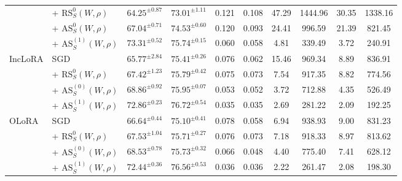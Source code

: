 \documentclass[10pt]{article} %
\begin{document}
{\begin{table}[ht]
{\begin{tabular}{@{}p{1.15cm} p{1.8cm} c c c c c c c c@{}}
& + $\mathrm{RS}^{0}_S(W,\rho)$  &$64.25^{\pm 0.87}$ & $73.01^{\pm 1.11}$ &0.121 &0.108 &47.29 &1444.96 &30.35 &1338.16\\
& + $\mathrm{AS}^{0}_S(W,\rho)$    &$67.04^{\pm 0.71}$ & $74.53^{\pm 0.60}$ & 0.120  & 0.093 & 24.41   & 996.59   & 21.39  & 821.45   \\
 & + $\mathrm{AS}^{(1)}_S(W,\rho)$   &$73.31^{\pm 0.52}$ & $75.74^{\pm 0.15}$  & 0.060  &0.058  & 4.81    & 339.49   & 3.72   & 240.91   \\
\midrule
\multirow{4}{*}{{IncLoRA}}
& SGD    &$65.77^{\pm 2.84}$  &$75.41^{\pm 0.26}$ & 0.076    & 0.062 & 15.46 & 969.34  & 8.89  & 836.91 \\
& + $\mathrm{RS}^{0}_S(W,\rho)$ & $67.42^{\pm 1.23}$ & $75.79^{\pm 0.42}$  &0.075 &0.073 &7.54 &917.35 &8.82 &774.56\\
& + $\mathrm{AS}^{(0)}_S(W,\rho)$    &$68.86^{\pm 0.92}$ & $75.95^{\pm 0.07}$  & 0.053   & 0.052 & 3.72    & 712.88   & 4.35   & 526.49   \\
 &+ $\mathrm{AS}^{(1)}_S(W,\rho)$  &$72.86^{\pm 0.23}$ & $76.72^{\pm 0.54}$  & 0.035   & 0.035 & 2.69    & 281.22   & 2.09   & 192.25   \\
\midrule
\multirow{4}{*}{{OLoRA}}
& SGD    &$66.64^{\pm 0.44}$ & $75.10^{\pm 0.41}$  & 0.078   & 0.058 & 6.94    & 938.93   & 9.00   & 831.23   \\
& + $\mathrm{RS}^{0}_S(W,\rho)$  & $67.53^{\pm 1.04}$ & $75.71^{\pm 0.27}$  &0.076 &0.073 &7.18 &918.33 &8.97 &813.62\\
& + $\mathrm{AS}^{(0)}_S(W,\rho)$     &$68.53^{\pm 0.78}$ & $75.73^{\pm 0.32}$  & 0.066   & 0.048 & 4.40    & 775.40   & 7.41   & 628.12   \\
 & + $\mathrm{AS}^{(1)}_S(W,\rho)$  &$72.44^{\pm 0.36}$ & $76.56^{\pm 0.53}$  & 0.036   & 0.036 & 2.22    & 261.47   & 2.08   & 198.30\\
\bottomrule
\end{tabular}
}
\end{table}
} 
\end{document}
